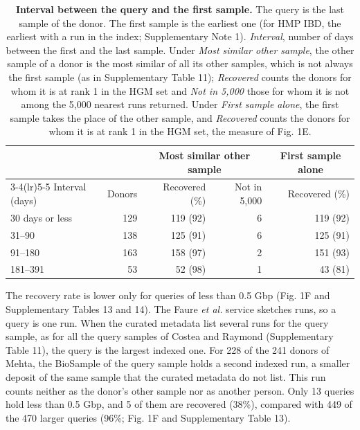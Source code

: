 \documentclass[11pt,a4paper]{article}
\begin{document}
\setcounter{table}{11}
\begin{table}[!htbp]\centering\small
\caption[Interval between the query and the first sample]{\textbf{Interval between the query and the first sample.} The query is the last sample of the donor. The first sample is the earliest one (for HMP IBD, the earliest with a run in the index; Supplementary Note 1). \textit{Interval}, number of days between the first and the last sample. Under \textit{Most similar other sample}, the other sample of a donor is the most similar of all its other samples, which is not always the first sample (as in Supplementary Table 11); \textit{Recovered} counts the donors for whom it is at rank 1 in the HGM set and \textit{Not in 5,000} those for whom it is not among the 5,000 nearest runs returned. Under \textit{First sample alone}, the first sample takes the place of the other sample, and \textit{Recovered} counts the donors for whom it is at rank 1 in the HGM set, the measure of Fig. 1E.}
\begin{tabular}{lrrrr}
\toprule
 & & \multicolumn{2}{c}{Most similar other sample} & \multicolumn{1}{c}{First sample alone} \\
\cmidrule(lr){3-4}\cmidrule(lr){5-5}
Interval (days) & Donors & Recovered (\%) & Not in 5,000 & Recovered (\%) \\
\midrule
30 days or less & 129 & 119 (92) & 6 & 119 (92) \\
31--90 & 138 & 125 (91) & 6 & 125 (91) \\
91--180 & 163 & 158 (97) & 2 & 151 (93) \\
181--391 & 53 & 52 (98) & 1 & 43 (81) \\
\bottomrule
\end{tabular}
\end{table}

The recovery rate is lower only for queries of less than 0.5 Gbp (Fig. 1F and Supplementary Tables 13 and 14). The Faure \textit{et al.} service sketches runs, so a query is one run. When the curated metadata list several runs for the query sample, as for all the query samples of Costea and Raymond (Supplementary Table 11), the query is the largest indexed one. For 228 of the 241 donors of Mehta, the BioSample of the query sample holds a second indexed run, a smaller deposit of the same sample that the curated metadata do not list. This run counts neither as the donor's other sample nor as another person. Only 13 queries hold less than 0.5 Gbp, and 5 of them are recovered (38\%), compared with 449 of the 470 larger queries (96\%; Fig. 1F and Supplementary Table 13).
\end{document}
